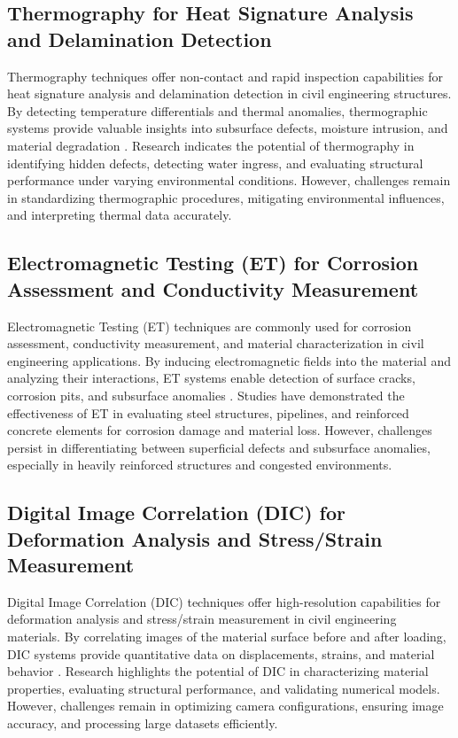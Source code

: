 \documentclass[journal, a4paper]{IEEEtran}
\begin{document}
\subsection{Thermography for Heat Signature Analysis and Delamination Detection}
Thermography techniques offer non-contact and rapid inspection capabilities for heat
signature analysis and delamination detection in civil engineering structures.
By detecting temperature differentials and thermal anomalies, thermographic systems provide valuable
insights into subsurface defects, moisture intrusion, and material degradation
\cite{rehman_advancing_2024} \cite{parida_comparative_2023} \cite{wu_internal_2024}.
Research indicates the potential of thermography in identifying hidden defects, detecting water ingress,
and evaluating structural performance under varying environmental conditions.
However, challenges remain in standardizing thermographic procedures, mitigating environmental influences,
and interpreting thermal data accurately. 

\subsection{Electromagnetic Testing (ET) for Corrosion Assessment and Conductivity Measurement}
Electromagnetic Testing (ET) techniques are commonly used for corrosion assessment, conductivity measurement,
and material characterization in civil engineering applications. By inducing electromagnetic fields into the material
and analyzing their interactions, ET systems enable detection of surface cracks, corrosion pits, and subsurface anomalies
\cite{carani_impact_2022} \cite{rufai_cure_2020} \cite{meng_effects_2021}. Studies have demonstrated the effectiveness of ET in evaluating steel structures, pipelines, and reinforced
concrete elements for corrosion damage and material loss. However, challenges persist in differentiating between superficial
defects and subsurface anomalies, especially in heavily reinforced structures and congested environments.

\subsection{Digital Image Correlation (DIC) for Deformation Analysis and Stress/Strain Measurement}
Digital Image Correlation (DIC) techniques offer high-resolution capabilities for deformation analysis and
stress/strain measurement in civil engineering materials. By correlating images of the material surface before
and after loading, DIC systems provide quantitative data on displacements, strains, and material behavior
\cite{sanchez-romate_structural_2021} \cite{pachon_evaluation_2020} \cite{de_menezes_defect_2021}.
Research highlights the potential of DIC in characterizing material properties, evaluating structural performance,
and validating numerical models. However, challenges remain in optimizing camera configurations, ensuring image accuracy,
and processing large datasets efficiently. 
\end{document}
